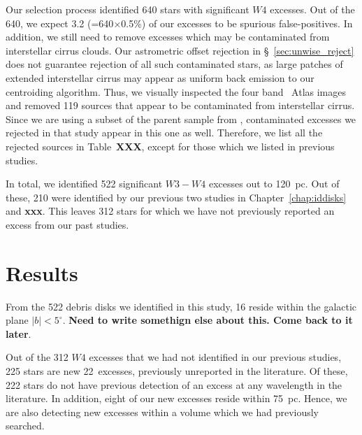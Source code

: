     Our selection process identified 640 stars with significant $W4$ excesses. Out of the 640, we expect 3.2 (=640$\times$0.5\%) of our excesses to be spurious false-positives. In addition, we still need to remove excesses which may be contaminated from interstellar cirrus clouds. Our astrometric offset rejection in \S~\ref{sec:unwise_reject} does not guarantee rejection of all such contaminated stars, as large patches of extended interstellar cirrus may appear as uniform back emission to our centroiding algorithm. Thus, we visually inspected the four band \WS\ Atlas images and removed 119 sources that appear to be contaminated from interstellar cirrus. Since we are using a subset of the parent sample from \citet{Patel2014}, contaminated excesses we rejected in that study appear in this one as well. Therefore, we list all the rejected sources in Table~\textbf{XXX}, except for those which we listed in previous studies. 
    
    In total, we identified 522 significant $W3-W4$ excesses out to 120~pc. Out of these, 210 were identified by our previous two studies in Chapter~\ref{chap:iddisks} and \textbf{xxx}. This leaves 312 stars for which we have not previously reported an excess from our past studies.
    
    \section{Results}
    
    From the 522 debris disks we identified in this study, 16 reside within the galactic plane $|b|<5^{\circ}$. \textbf{Need to write somethign else about this. Come back to it later}.
    
    Out of the 312 $W4$ excesses that we had not identified in our previous studies, 225 stars are new 22\micron\ excesses, previously unreported in the literature. Of these, 222 stars do not have previous detection of an excess at any wavelength in the literature. In addition, eight of our new excesses reside within 75~pc. Hence, we are also detecting new excesses within a volume which we had previously searched. 
    
